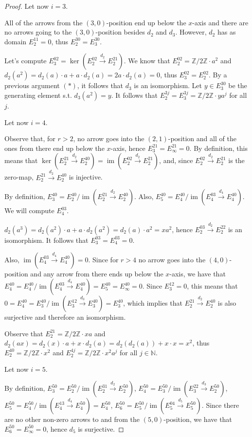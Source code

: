 \documentclass{article}
\newcommand{\numberset}{\mathbb}
\newcommand{\N}{\numberset{N}}
\newcommand{\Z}{\numberset{Z}}
\DeclareMathOperator{\im}{im}
\begin{document}
\begin{proof}
    Let now $i=3$.

    All of the arrows from the $(3,0)$-position end up below the $x$-axis and
    there are no arrows going to the $(3,0)$-position besides $d_2$ and $d_3$.
    However, $d_2$ has as domain $E^{11}_2=0$, thus $E^{30}_2=E^{30}_3$.

    Let's compute $E^{02}_3=\ker(E^{02}_2\xrightarrow{d_2}E^{21}_2)$. We know
    that $E^{02}_2=\Z/2\Z\cdot a^2$ and $d_2(a^2)=d_2(a)\cdot a+a\cdot
    d_2(a)=2a\cdot d_2(a)=0$, thus $E^{02}_3=E^{02}_2$. By a previous argument
    $(*)$, it follows that $d_3$ is an isomorphism. Let $y\in E^{30}_3$ be the
    generating element s.t. $d_3(a^2)=y$. It follows that
    $E^{3j}_2=E^{3j}_3=\Z/2\Z\cdot ya^j$ for all $j$.

    Let now $i=4$.

    Observe that, for $r>2$, no arrow goes into the $(2,1)$-position and all of
    the ones from there end up below the $x$-axis, hence
    $E^{21}_3=E^{21}_\infty=0$. By definition, this means that
    $\ker(E^{21}_2\xrightarrow{d_2}E^{40}_2)=\im(E^{02}_2\xrightarrow{d_2}E^{21}_2)$,
    and, since $E^{02}_2\xrightarrow{d_2}E^{21}_2$ is the zero-map,
    $E^{21}_2\xrightarrow{d_2}E^{40}_2$ is injective.

    By definition, $E^{40}_3=E^{40}_2/\im(E^{21}_2\xrightarrow{d_2}E^{40}_2)$.
    Also, $E^{40}_5=E^{40}_4/\im(E^{03}_4\xrightarrow{d_4}E^{40}_4)$. We will
    compute $E^{03}_4$.

    $d_2(a^3)=d_2(a^2)\cdot a+a\cdot d_2(a^2)=d_2(a)\cdot a^2=xa^2$, hence
    $E^{03}_2\xrightarrow{d_2}E^{22}_2$ is an isomorphism. It follows that
    $E^{03}_3=E^{03}_4=0$.
    
    Also, $\im(E^{03}_4\xrightarrow{d_4}E^{40}_4)=0$. Since for $r>4$ no
    arrow goes into the $(4,0)$-position and any arrow from there ends up below
    the $x$-axis, we have that
    $E^{40}_4=E^{40}_4/\im(E^{03}_4\xrightarrow{d_4}E^{40}_4)=
    E^{40}_5=E^{40}_\infty=0$. Since $E^{12}_3=0$, this means that
    $0=E^{40}_4=E^{40}_3/\im(E^{12}_3\xrightarrow{d_3}E^{40}_3)=E^{40}_3$, which
    implies that $E^{21}_2\xrightarrow{d_2}E^{40}_2$ is also surjective and
    therefore an isomorphism.

    Observe that $E^{21}_2=\Z/2\Z\cdot xa$ and $d_2(ax)=d_2(x)\cdot a+x\cdot
    d_2(a)=d_2(d_2(a))+x\cdot x=x^2$, thus $E^{40}_2=\Z/2\Z\cdot x^2$ and
    $E^{4j}_2=\Z/2\Z\cdot x^2a^j$ for all $j\in\N$.

    Let now $i=5$.

    By definition, $E^{50}_3=E^{50}_2/\im(E^{31}_2\xrightarrow{d_2}E^{50}_2)$,
    $E^{50}_4=E^{50}_3/\im(E^{22}_3\xrightarrow{d_3}E^{50}_2)$,
    $E^{50}_5=E^{50}_4/\im(E^{13}_4\xrightarrow{d_4}E^{50}_4)=E^{50}_4$,
    $E^{50}_6=E^{50}_5/\im(E^{04}_5\xrightarrow{d_5}E^{50}_5)$. Since there are
    no other non-zero arrows to and from the $(5,0)$-position, we have that
    $E^{50}_6=E^{50}_\infty=0$, hence $d_5$ is surjective.


\end{proof}
\end{document}
